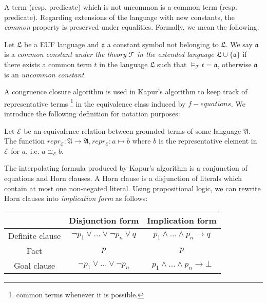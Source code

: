 A term (resp. predicate) which is not uncommon is a 
common term (resp. predicate).
Regarding extensions of the language with new constants, 
the \emph{common} property
is preserved under equalities. Formally, we mean the following:

\begin{definition}
  Let $\mathfrak{L}$ be a EUF language and $\mathfrak{a}$ a constant symbol
  not belonging to $\mathfrak{L}$. We say $\mathfrak{a}$ is a \emph{common constant under
  the theory $\mathcal{T}$ in the extended language $\mathfrak{L} \cup \{\mathfrak{a}\}$}
  if there exists a common term $t$ in the language $\mathfrak{L}$ such that 
  $\models_{\mathcal{T}} t = \mathfrak{a}$, otherwise $\mathfrak{a}$ is an \emph{
  uncommon constant}.
\end{definition}

A congruence closure algorithm is used in Kapur's algorithm
to keep track of representative terms \footnote{common terms
whenever it is possible.} in the equivalence class
induced by $f-equations$.
We introduce the following definition for notation purposes:

\begin{definition}
  Let $\mathcal{E}$ be an equivalence relation between grounded terms of some 
  language $\mathfrak{A}$. The function $repr_{\mathcal{E}} : \mathfrak{A} \rightarrow 
  \mathfrak{A} , repr_{\mathcal{E}} : a \mapsto b$  where $b$ is the representative
  element in $\mathcal{E}$ for $a$, i.e. $a \cong_{\mathcal{E}} b$.

\end{definition}

The interpolating formula produced by Kapur's algorithm is 
a conjunction of equations
and Horn clauses. A Horn clause is a disjunction of literals which 
contain at most
one non-negated literal. Using propositional logic, we can rewrite
Horn clauses into \emph{implication form} as follows:

\begin{table}[H]
  \centering
  \begin{tabular}{c|c|c}
    \toprule
    {} & Disjunction form & Implication form \\
    \toprule
    Definite clause & $\neg p_1 \lor \dots \lor \neg p_n \lor q$ & $p_1 \land \dots \land p_n \rightarrow q$ \\
    \midrule
    Fact & $p$ & $p$ \\
    \midrule
    Goal clause & $\neg p_1 \lor \dots \lor \neg p_n$ & $p_1 \land \dots \land p_n \rightarrow \bot$ \\
    \bottomrule
  \end{tabular}
\end{table}

